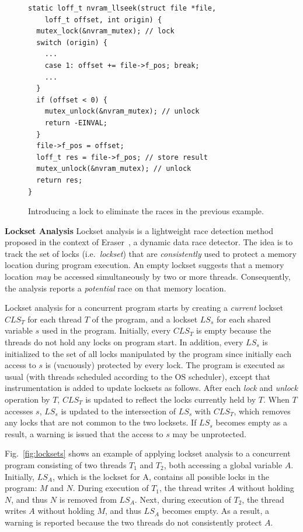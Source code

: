 \begin{figure}[t]
\begin{lstlisting}
static loff_t nvram_llseek(struct file *file,
    loff_t offset, int origin) {
  mutex_lock(&nvram_mutex); // lock
  switch (origin) {
    ...
    case 1: offset += file->f_pos; break;
    ...
  }
  if (offset < 0) {
    mutex_unlock(&nvram_mutex); // unlock
    return -EINVAL;
  }
  file->f_pos = offset;
  loff_t res = file->f_pos; // store result
  mutex_unlock(&nvram_mutex); // unlock
  return res;
}
\end{lstlisting}
\vspace{-2mm}
\caption{Introducing a lock to eliminate the races in the previous example.}
\label{fig:lock_example}
\end{figure}

\noindent\textbf{Lockset Analysis }
%
Lockset analysis is a lightweight race detection method proposed in the context of Eraser~\cite{savage1997eraser}, a dynamic data race detector.  The idea is to track the set of locks (i.e.\ \emph{lockset}) that are \emph{consistently} used to protect a memory location during program execution. An empty lockset suggests that a memory location \emph{may} be accessed simultaneously by two or more threads. Consequently, the analysis reports a \emph{potential} race on that memory location.

Lockset analysis for a concurrent program starts by creating a \emph{current} lockset $\mathit{CLS}_T$ for each thread $T$ of the program, and a lockset $\mathit{LS}_s$ for each shared variable $s$ used in the program. Initially, every $\mathit{CLS}_T$ is empty because the threads do not hold any locks on program start. In addition, every $\mathit{LS}_s$ is initialized to the set of all locks manipulated by the program since initially each access to $s$ is (vacuously) protected by every lock. The program is executed as usual (with threads scheduled according to the OS scheduler), except that instrumentation is added to update locksets as follows.
%
After each \emph{lock} and \emph{unlock} operation by $T$, $\mathit{CLS}_T$ is updated to reflect the locks currently held by $T$.
%
When $T$ accesses $s$, $\mathit{LS}_s$ is updated to the intersection of $\mathit{LS}_s$ with $\mathit{CLS}_T$, which removes any locks that are not common to the two locksets.
%
If $\mathit{LS}_s$ becomes empty as a result, a warning is issued that the access to $s$ may be unprotected.

Fig.~\ref{fig:locksets} shows an example of applying lockset analysis to a concurrent program consisting of two threads $T_1$ and $T_2$, both accessing a global variable $A$. Initially, $\mathit{LS}_A$, which is the lockset for A, contains all possible locks in the program: $M$ and $N$. During execution of $T_1$, the thread writes $A$ without holding $N$, and thus $N$ is removed from $\mathit{LS}_A$. Next, during execution of $T_2$, the thread writes $A$ without holding $M$, and thus $\mathit{LS}_A$ becomes empty. As a result, a warning is reported because the two threads do not consistently protect $A$.

